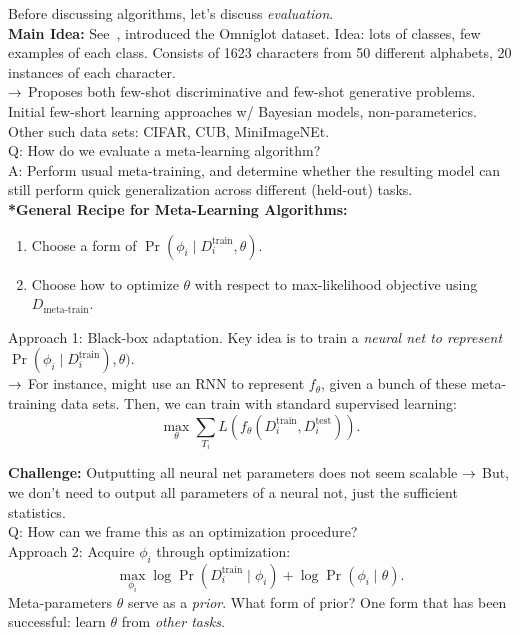 Before discussing algorithms, let's discuss {\it evaluation}. \\

{\bf Main Idea:} See~\citet{lake2015human}, introduced the Omniglot dataset. Idea: lots of classes, few examples of each class. Consists of 1623 characters from 50 different alphabets, 20 instances of each character. \\

$\rightarrow$ Proposes both few-shot discriminative and few-shot generative problems. Initial few-short learning approaches w/ Bayesian models, non-parameterics. Other such data sets: CIFAR, CUB, MiniImageNEt. \\

Q: How do we evaluate a meta-learning algorithm? \\

A: Perform usual meta-training, and determine whether the resulting model can still perform quick generalization across different (held-out) tasks. \\

{\bf **General Recipe for Meta-Learning Algorithms:}
\begin{enumerate}
\item Choose a form of $\Pr(\phi_i \mid D_i^{\text{train}}, \theta)$.
\item Choose how to optimize $\theta$ with respect to max-likelihood objective using $D_{\text{meta-train}}$.
\end{enumerate}

Approach 1: Black-box adaptation. Key idea is to train a {\it neural net to represent} $\Pr(\phi_i \mid D_i^{\text{train}}), \theta)$. \\

$\rightarrow$ For instance, might use an RNN to represent $f_\theta$, given a bunch of these meta-training data sets. Then, we can train with standard supervised learning:
\[
\max_\theta \sum_{T_i} L(f_\theta(D_i^{\text{train}}, D_i^{\text{test}})).
\]

{\bf Challenge:} Outputting all neural net parameters does not seem scalable
$\rightarrow$ But, we don't need to output all parameters of a neural not, just the sufficient statistics. \\

Q: How can we frame this as an optimization procedure? \\

Approach 2: Acquire $\phi_i$ through optimization:
\[
\max_{\phi_i} \log \Pr(D_i^{\text{train}} \mid \phi_i) + \log \Pr(\phi_i \mid \theta).
\]
Meta-parameters $\theta$ serve as a {\it prior}. What form of prior? One form that has been successful: learn $\theta$ from {\it other tasks}. \\

